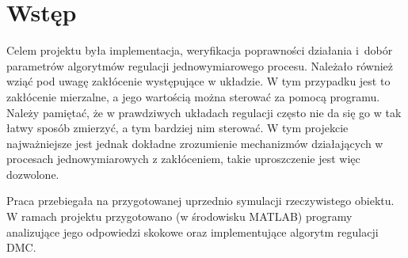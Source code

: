 \chapter{Wstęp}

Celem projektu była implementacja, weryfikacja poprawności działania i~dobór parametrów algorytmów regulacji jednowymiarowego procesu. Należało również wziąć pod uwagę zakłócenie występujące w układzie. W tym przypadku jest to zakłócenie mierzalne, a jego wartością można sterować za pomocą programu. Należy pamiętać, że w prawdziwych układach regulacji często nie da się go w tak łatwy sposób zmierzyć, a tym bardziej nim sterować. W tym projekcie najważniejsze jest jednak dokładne zrozumienie mechanizmów działających w procesach jednowymiarowych z zakłóceniem, takie uproszczenie jest więc dozwolone.

Praca przebiegała na przygotowanej uprzednio symulacji rzeczywistego obiektu. W ramach projektu przygotowano (w środowisku MATLAB) programy analizujące jego odpowiedzi skokowe oraz implementujące algorytm regulacji DMC.